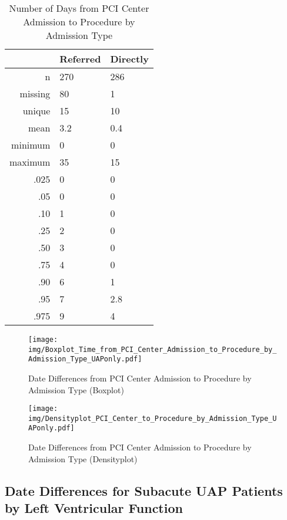 \documentclass[a4paper]{report}
\begin{document}
\begin{itemize}
{%
\begin{table}[ht]
\centering
\begin{tabular}{rll}
  \toprule
 & Referred & Directly \\ 
  \midrule
n & 270 & 286 \\ 
  missing & 80 & 1 \\ 
  unique & 15 & 10 \\ 
  mean & 3.2 & 0.4 \\ 
  minimum & 0 & 0 \\ 
  maximum & 35 & 15 \\ 
  .025 & 0 & 0 \\ 
  .05 & 0 & 0 \\ 
  .10 & 1 & 0 \\ 
  .25 & 2 & 0 \\ 
  .50 & 3 & 0 \\ 
  .75 & 4 & 0 \\ 
  .90 & 6 & 1 \\ 
  .95 & 7 & 2.8 \\ 
  .975 & 9 & 4 \\ 
   \bottomrule
\end{tabular}
\caption{Number of Days from PCI Center Admission to Procedure by Admission Type} 
\end{table}
\begin{figure}
  \centering
  \caption{Date Differences from PCI Center Admission to Procedure by Admission Type (Boxplot)}
  \label{Boxplot: Date Differences from PCI Center Admission to Procedure by Admission Type}
\texttt{[image: img/Boxplot\_Time\_from\_PCI\_Center\_Admission\_to\_Procedure\_by\_Admission\_Type\_UAPonly.pdf]}\end{figure}


\begin{figure}
  \centering
  \caption{Date Differences from PCI Center Admission to Procedure by Admission Type (Densityplot)}
  \label{Density: Date Differences from PCI Center Admission to Procedure by Admission Type}
\texttt{[image: img/Densityplot\_PCI\_Center\_to\_Procedure\_by\_Admission\_Type\_UAPonly.pdf]}\end{figure}










\clearpage
\subsection{Date Differences for Subacute UAP Patients by Left Ventricular Function}

}
\end{itemize}
\end{document}

